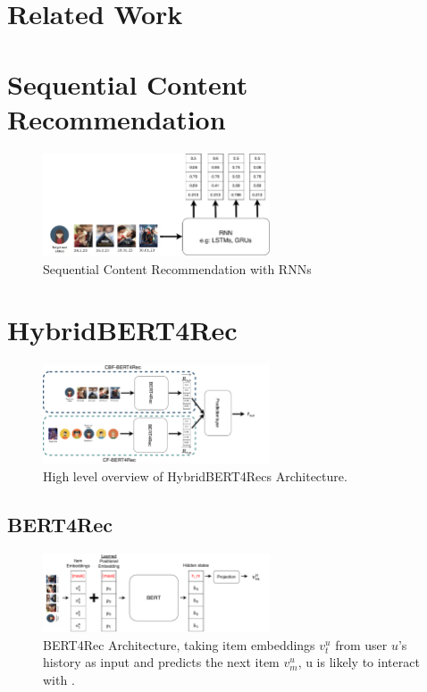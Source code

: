 \documentclass{Academic}
\begin{document}
    \section{Related Work}

    \section{Sequential Content Recommendation}

    \begin{figure}[ht!]
        \centering
        \includegraphics[width=0.6\textwidth]{images/rnn_seq.pdf}
        \caption{Sequential Content Recommendation with RNNs \cite{yuDynamicRecurrentModel2016}}
        \label{fig:seqRNN}
    \end{figure}

    \FloatBarrier

    \section{HybridBERT4Rec}
        \begin{figure}[ht!]
            \centering
            \includegraphics[width=0.6\textwidth]{images/hybridBERT4Rec_high_level.pdf}
            \caption{High level overview of HybridBERT4Recs Architecture. \cite{channarongHybridBERT4RecHybridContentBased2022}}
            \label{fig:highlevel}
        \end{figure}

        \subsection{BERT4Rec}
        \begin{figure}[ht!]
            \centering
            \includegraphics[width=0.6\textwidth]{images/BERT4Rec.pdf}
            \caption{BERT4Rec Architecture, taking item embeddings $v_t^u$ from user $u$'s history as input and predicts the next item $v_m^u$, u is likely to interact with \cite{sunBERT4RecSequentialRecommendation2019}.}
            \label{fig:bert4rec}
        \end{figure}
\end{document}
